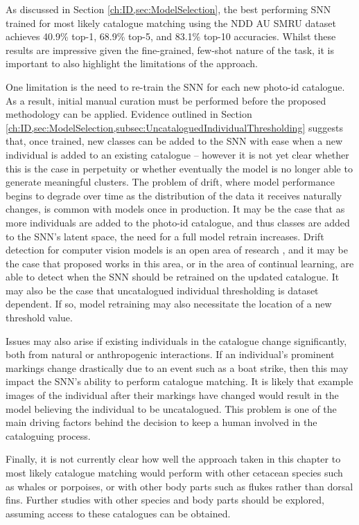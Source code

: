 As discussed in Section \ref{ch:ID,sec:ModelSelection}, the best performing SNN trained for most likely catalogue matching using the NDD AU SMRU dataset achieves 40.9\% top-1, 68.9\% top-5, and 83.1\% top-10 accuracies. Whilst these results are impressive given the fine-grained, few-shot nature of the task, it is important to also highlight the limitations of the approach. 

One limitation is the need to re-train the SNN for each new photo-id catalogue. As a result, initial manual curation must be performed before the proposed methodology can be applied. Evidence outlined in Section \ref{ch:ID,sec:ModelSelection,subsec:UncataloguedIndividualThresholding} suggests that, once trained, new classes can be added to the SNN with ease when a new individual is added to an existing catalogue -- however it is not yet clear whether this is the case in perpetuity or whether eventually the model is no longer able to generate meaningful clusters. The problem of drift, where model performance begins to degrade over time as the distribution of the data it receives naturally changes, is common with models once in production. It may be the case that as more individuals are added to the photo-id catalogue, and thus classes are added to the SNN's latent space, the need for a full model retrain increases. Drift detection for computer vision models is an open area of research \cite{siva_weakly_2011, suprem_odin_2020, nagar_concept_2020, cobb_context-aware_2022}, and it may be the case that proposed works in this area, or in the area of continual learning, are able to detect when the SNN should be retrained on the updated catalogue. It may also be the case that uncatalogued individual thresholding is dataset dependent. If so, model retraining may also necessitate the location of a new threshold value.  

Issues may also arise if existing individuals in the catalogue change significantly, both from natural or anthropogenic interactions. If an individual's prominent markings change drastically due to an event such as a boat strike, then this may impact the SNN's ability to perform catalogue matching. It is likely that example images of the individual after their markings have changed would result in the model believing the individual to be uncatalogued. This problem is one of the main driving factors behind the decision to keep a human involved in the cataloguing process.

Finally, it is not currently clear how well the approach taken in this chapter to most likely catalogue matching would perform with other cetacean species such as whales or porpoises, or with other body parts such as flukes rather than dorsal fins. Further studies with other species and body parts should be explored, assuming access to these catalogues can be obtained. 

